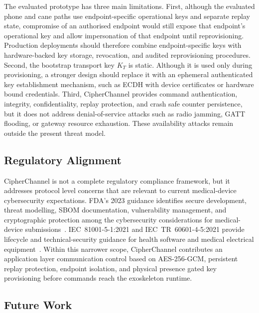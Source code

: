 \documentclass[journal]{IEEEtran}
\begin{document}
The evaluated prototype has three main limitations. First, although the evaluated phone and cane paths use endpoint-specific operational keys and separate replay state, compromise of an authorised endpoint would still expose that endpoint's operational key and allow impersonation of that endpoint until reprovisioning. Production deployments should therefore combine endpoint-specific keys with hardware-backed key storage, revocation, and audited reprovisioning procedures. Second, the bootstrap transport key $K_T$ is static. Although it is used only during provisioning, a stronger design should replace it with an ephemeral authenticated key establishment mechanism, such as ECDH with device certificates or hardware bound credentials. Third, CipherChannel provides command authentication, integrity, confidentiality, replay protection, and crash safe  counter persistence, but it does not address denial-of-service attacks such as radio jamming, GATT flooding, or gateway resource exhaustion. These availability attacks remain outside the present threat model.

\subsection{Regulatory Alignment}
\label{sec:regulatory}

CipherChannel is not a complete regulatory compliance framework, but it addresses protocol level concerns that are relevant to current medical-device cybersecurity expectations. FDA's 2023 guidance identifies secure development, threat modelling, SBOM documentation, vulnerability management, and cryptographic protection among the cybersecurity considerations for medical-device submissions~\cite{fda2023guidance}. IEC~81001-5-1:2021 and IEC~TR~60601-4-5:2021 provide lifecycle and technical-security guidance for health software and medical electrical equipment~\cite{iec81001,iec60601_4_5}. Within this narrower scope, CipherChannel contributes an application layer communication control based on AES-256-GCM, persistent replay protection, endpoint isolation, and physical presence gated key provisioning before commands reach the exoskeleton runtime.

\subsection{Future Work}
\label{sec:futurework}
\end{document}
